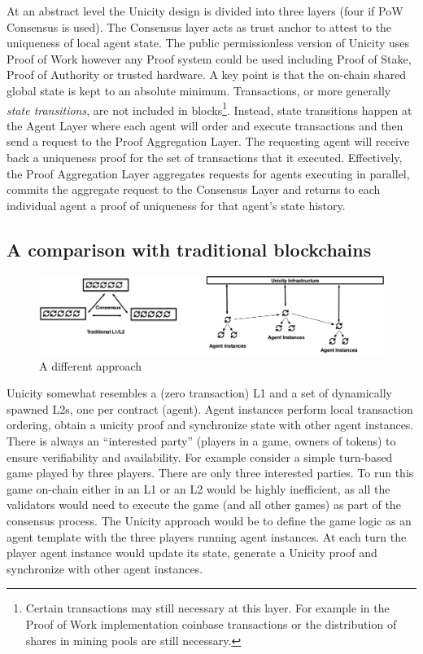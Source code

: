 \documentclass{article}
\begin{document}
At an abstract level the Unicity design is divided into three layers (four if PoW Consensus is used). The Consensus layer acts as trust anchor to attest to the uniqueness of local agent state. The public permissionless version of Unicity uses Proof of Work however any Proof system could be used including Proof of Stake, Proof of Authority or trusted hardware. A key point is that the on-chain shared global state is kept to an absolute minimum. Transactions, or more generally \textit{state transitions}, are not included in blocks\footnote{Certain transactions may still necessary at this layer. For example in the Proof of Work implementation coinbase transactions or the distribution of shares in mining pools are still necessary.}.
	Instead, state transitions happen at the Agent Layer where each agent will order and execute transactions and then send a request to the Proof Aggregation Layer. The requesting agent will receive back a uniqueness proof for the set of transactions that it executed. Effectively, the Proof Aggregation Layer aggregates requests for agents executing in parallel,  commits the aggregate request to the Consensus Layer and returns to each individual agent a proof of uniqueness for that agent's state history.



\subsection{A comparison with traditional blockchains}

\begin{figure}[htbp]
    \centering
    \includegraphics[width=\textwidth]{Comparison.png}
    \caption{A different approach}
    \label{fig:comp}
\end{figure}

Unicity somewhat resembles a (zero transaction) L1 and a set of dynamically spawned L2s, one per contract (agent). Agent instances perform local transaction ordering, obtain a unicity proof and synchronize state with other agent instances. There is always an ``interested party'' (players in a game, owners of tokens) to ensure verifiability and availability. For example consider a simple turn-based game played by three players. There are only three interested parties. To run this game on-chain either in an L1 or an L2 would be highly inefficient, as all the validators would need to execute the game (and all other games) as part of the consensus process. The Unicity approach would be to define the game logic as an agent template with the three players running agent instances. At each turn the player agent instance would update its state, generate a Unicity proof and synchronize with other agent instances.
\end{document}

